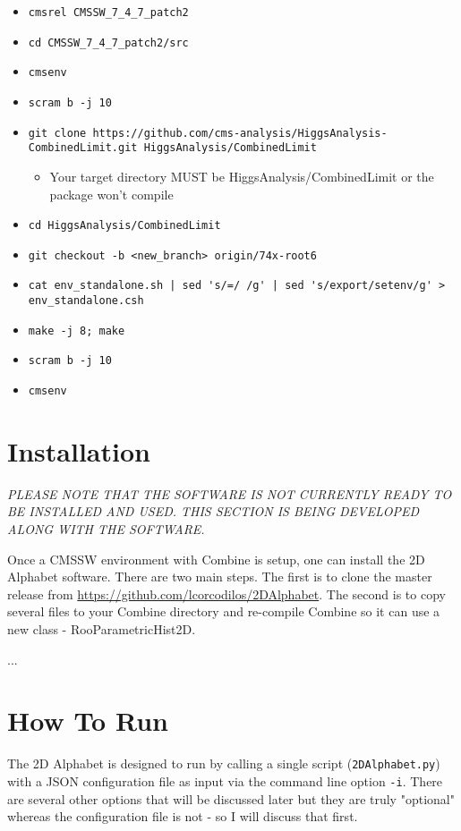 \documentclass[letter]{article}
\begin{document}
    \begin{itemize}
        \item \verb"cmsrel CMSSW_7_4_7_patch2"
        \item \verb"cd CMSSW_7_4_7_patch2/src"
        \item \verb"cmsenv"
        \item \verb"scram b -j 10"
        \item \verb"git clone https://github.com/cms-analysis/HiggsAnalysis-CombinedLimit.git HiggsAnalysis/CombinedLimit"
        \begin{itemize}
            \item Your target directory MUST be HiggsAnalysis/CombinedLimit or the package won't compile
        \end{itemize}
        \item \verb"cd HiggsAnalysis/CombinedLimit"
        \item \verb"git checkout -b <new_branch> origin/74x-root6"
        \item \verb"cat env_standalone.sh | sed 's/=/ /g' | sed 's/export/setenv/g' > env_standalone.csh"
        \item \verb"make -j 8; make"
        \item \verb"scram b -j 10"
        \item \verb"cmsenv"
    \end{itemize}

\section{Installation}
    \textit{PLEASE NOTE THAT THE SOFTWARE IS NOT CURRENTLY READY TO BE INSTALLED AND USED. THIS SECTION IS BEING DEVELOPED ALONG WITH THE SOFTWARE.}

    Once a CMSSW environment with Combine is setup, one can install the 2D Alphabet software. There are two main steps. The first is to clone the master release from \url{https://github.com/lcorcodilos/2DAlphabet}. The second is to copy several files to your Combine directory and re-compile Combine so it can use a new class - RooParametricHist2D.

    ...

\section{How To Run}
    The 2D Alphabet is designed to run by calling a single script (\verb"2DAlphabet.py") with a JSON configuration file as input via the command line option \verb"-i". There are several other options that will be discussed later but they are truly "optional" whereas the configuration file is not - so I will discuss that first.
\end{document}
